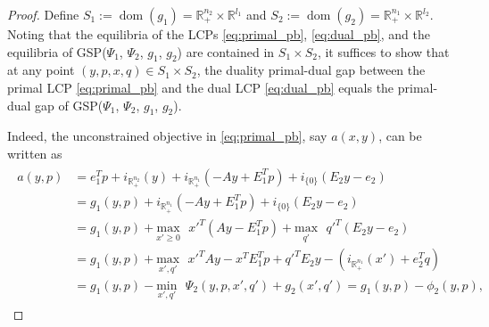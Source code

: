 \documentclass{article} %
\DeclareMathOperator{\dom}{dom}
\begin{document}
\begin{proof}
Define $S_1 := \dom(g_1) = \mathbb{R}^{n_2}_+ \times \mathbb{R}^{l_1}$
and $S_2 := \dom(g_2) = 
\mathbb{R}^{n_1}_+ \times \mathbb{R}^{l_2}$. Noting that the
equilibria of the LCPs \eqref{eq:primal_pb},
\eqref{eq:dual_pb}, and the equilibria of GSP($\Psi_1$, $\Psi_2$,
$g_1$, $g_2$) are contained in $S_1 \times S_2$, it suffices to show
that at any point $(y, p, x, q) \in S_1 \times S_2$, the duality
primal-dual gap between the primal LCP \eqref{eq:primal_pb} and the
dual LCP \eqref{eq:dual_pb} equals the primal-dual gap of
GSP($\Psi_1$, $\Psi_2$, $g_1$, $g_2$).


Indeed, the unconstrained objective in \eqref{eq:primal_pb}, say
$a(x,y)$, can be written as
\begin{eqnarray*}
  \begin{aligned}
    a(y,p) &= e_1^Tp +
    i_{\mathbb{R}^{n_2}_+}(y) + i_{\mathbb{R}^{n_1}_+}(-Ay + E_1^Tp) +
    i_{\{0\}}(E_2y - e_2)\\
    &= g_1(y,p) +
    i_{\mathbb{R}^{n_1}_+}(-Ay + E_1^Tp) + i_{\{0\}}(E_2y - e_2)\\
    &= g_1(y,p) + \underset{x' \geq
      0}{\text{max}}\text{ }x'^T(Ay - E_1^Tp) +
    \underset{q'}{\text{max}}\text{ }q'^T(E_2y - e_2)\\
    &= g_1(y,p) + \underset{x',
      q'}{\text{max}}\text{ }x'^TAy - x^TE_1^Tp + q'^TE_2y -
    (i_{\mathbb{R}^{n_1}_+}(x') + e_2^Tq)\\
    &= g_1(y,p)
      - \underset{x',q'}{\text{min}}\text{ }\Psi_2(y, p, x', q') + g_2(x',
      q') = g_1(y,p) -\phi_2(y,p),
  \end{aligned}
  \label{eq:a}
\end{eqnarray*}


\end{proof}
\end{document}
